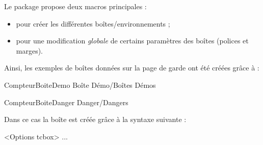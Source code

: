 \documentclass[french,11pt,a4paper]{article}
\begin{document}
Le package propose deux macros principales :

\begin{itemize}
	\item {} pour créer les différentes boîtes/environnements ;
	\item {} pour une modification \textit{globale} de certains paramètres des boîtes (polices et marges).
\end{itemize}

\medskip

\begin{codehigh}[language=latex/latex2,style/main=cyan!10,style/code=cyan!10]
\ParamBoites[Clés]
\end{codehigh}

\medskip

Ainsi, les exemples de boîtes données sur la page de garde ont été créées grâce à :

\begin{codehigh}[language=latex/latex2,style/main=cyan!10,style/code=cyan!10]
    {CompteurBoiteDemo}            %
    {\faIcons}                     %
    {Boîte Démo/Boîtes Démos}      %

    {CompteurBoiteDanger}          %
    {\faBomb}                      %
    {Danger/Dangers}               %
\end{codehigh}

\begin{demohigh}[language=latex/latex2,style/main=cyan!10,style/code=cyan!10]
\setcounter{CompteurBoiteDemo}{0}
\setcounter{CompteurBoiteDanger}{0}
\begin{BoiteDeDemo}
    \lipsum[1][1]
\end{BoiteDeDemo}

\begin{BoiteDanger}
    \lipsum[2][1]
\end{BoiteDanger}
\end{demohigh}

Dans ce cas la boîte est créée grâce à la syntaxe suivante :

\begin{codehigh}[language=latex/latex2,style/main=cyan!10,style/code=cyan!10]
\begin{NomEnv}[Clés]<Options tcbox>
...
\end{NomEnv}
\end{codehigh}
\end{document}
